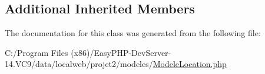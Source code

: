 \subsection*{Additional Inherited Members}


The documentation for this class was generated from the following file\+:\begin{DoxyCompactItemize}
\item 
C\+:/\+Program Files (x86)/\+Easy\+P\+H\+P-\/\+Dev\+Server-\/14.\+V\+C9/data/localweb/projet2/modeles/\hyperlink{_modele_location_8php}{Modele\+Location.\+php}\end{DoxyCompactItemize}
